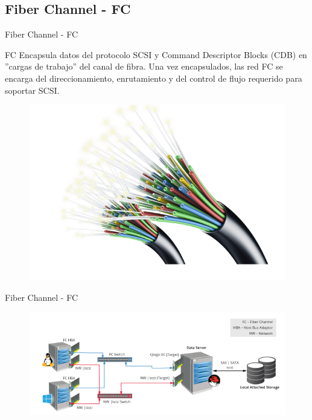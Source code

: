 \documentclass[10pt]{beamer}
\begin{document}
\subsection{Fiber Channel - FC}

\begin{frame}{Fiber Channel - FC}
\begin{alertblock}{FC}
Encapsula datos del protocolo SCSI y Command Descriptor Blocks
(CDB) en ”cargas de trabajo” del canal de fibra. Una vez encapsulados, las
red FC se encarga del direccionamiento, enrutamiento y del control de flujo
requerido para soportar SCSI.
\end{alertblock}
\begin{figure}[h]
\center
\includegraphics[scale=0.35]{fc.png}
\end{figure}

\end{frame}
\begin{frame}{Fiber Channel - FC}
\begin{figure}[h]
\center
\includegraphics[scale=0.58]{fc1.png}
\end{figure}
\end{frame}
\end{document}
